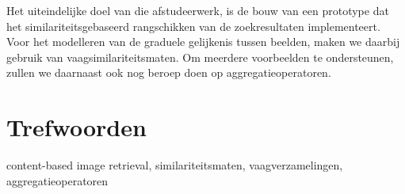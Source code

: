 Het uiteindelijke doel van die afstudeerwerk, is de bouw van een prototype dat
het similariteitsgebaseerd rangschikken van de zoekresultaten implementeert.
Voor het modelleren van de graduele gelijkenis tussen beelden, maken we daarbij gebruik van 
vaagsimilariteitsmaten. Om meerdere voorbeelden te ondersteunen, zullen we daarnaast
ook nog beroep doen op aggregatieoperatoren.

\section*{Trefwoorden}
content-based image retrieval, similariteitsmaten, vaagverzamelingen, aggregatieoperatoren

